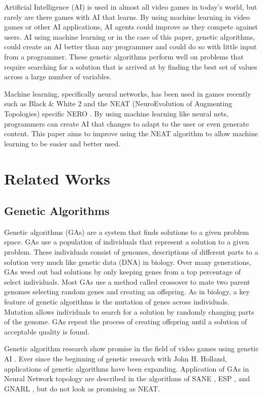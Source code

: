 \documentclass[12pt]{ucthesis} \newif\ifpdf \ifx\pdfoutput\undefined
\begin{document}
Artificial Intelligence (AI) is used in almost all video games in today's world,
but rarely are there games with AI that learns. By using machine learning in video
games or other AI applications, AI agents could improve as they compete against
users.
AI using machine learning or in the case of this paper, genetic algorithms, could
create an AI better than any programmer and could do so with little input from a
programmer. These genetic algorithms perform well on problems that require
searching for a solution that is arrived at by finding the best set of values
across a large number of variables.

Machine learning, specifically neural networks, has been used in games recently
such as Black & White 2 and the NEAT (NeuroEvolution of Augmenting Topologies)
specific NERO \cite{hastings2009evolving}.
By using machine learning like neural nets, programmers can create AI that
changes to adapt to the user or even generate content. This paper aims to
improve using the NEAT algorithm to allow machine learning to be easier and
better used. 
 

\chapter{Related Works}


\section{Genetic Algorithms}
 
Genetic algorithms (GAs) are a system that finds solutions to a given problem
space. GAs use a population of individuals that represent a solution to a given
problem. These individuals consist of genomes, descriptions of different parts
to a solution very much like genetic data (DNA) in biology. Over many
generations, GAs weed out bad solutions by only keeping genes from a top
percentage of select individuals. Most GAs use a method called crossover to mate
two parent genomes selecting random genes and creating an offspring. As in biology, a key
feature of genetic algorithms is the mutation of genes across individuals. 
Mutation allows individuals to search for a solution by randomly changing parts
of the genome. GAs repeat the process of creating offspring until a solution of
acceptable quality is found.

Genetic algorithm research show promise in the field of video games using
genetic AI \cite{Revello,PengHuo,Chih-Sheng}. Ever since the beginning of genetic research with John H. Holland, applications of genetic algorithms have
been expanding. Application of GAs in Neural Network topology are
described in the algorithms of SANE \cite{moriarty:focus} , ESP
\cite{gomez:proposal} , and GNARL \cite{Angeline}, but do not look as promising
as NEAT.
\end{document}

